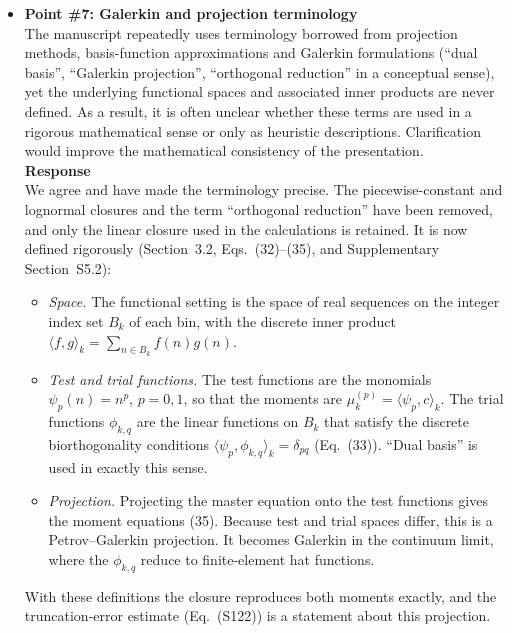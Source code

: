 \documentclass{article}
\newif\ifshowauthornotes
\newcommand{\authornote}[1]{\ifshowauthornotes{\color{red}\ [\textbf{Author action:} #1]}\fi}
\begin{document}
\begin{itemize}
\authornote{Neither item is in the September 17 PDF. (a) Table~S3 lists no solute trap concentrations or binding energies, and the effective-frequency expression (former Eq.~(125)) no longer appears in the main text or S3. Add both, with sources. (b) Add the explicit $G_n$ and $G_{m,\ell}$ used (e.g., normalized power-law or exponential between $n=2$ and $i_{\rm cascade}$) and $\eta$.}

\item \textbf{Point \#7: Galerkin and projection terminology}\\
The manuscript repeatedly uses terminology borrowed from projection methods, basis-function approximations and Galerkin formulations (``dual basis'', ``Galerkin projection'', ``orthogonal reduction'' in a conceptual sense), yet the underlying functional spaces and associated inner products are never defined. As a result, it is often unclear whether these terms are used in a rigorous mathematical sense or only as heuristic descriptions. Clarification would improve the mathematical consistency of the presentation.\\

\textbf{Response}\\
We agree and have made the terminology precise. The piecewise-constant and lognormal closures and the term ``orthogonal reduction'' have been removed, and only the linear closure used in the calculations is retained. It is now defined rigorously (Section~3.2, Eqs.~(32)--(35), and Supplementary Section~S5.2):
\begin{itemize}
    \item \emph{Space.} The functional setting is the space of real sequences on the integer index set $B_k$ of each bin, with the discrete inner product $\langle f,g\rangle_k=\sum_{n\in B_k}f(n)g(n)$.
    \item \emph{Test and trial functions.} The test functions are the monomials $\psi_p(n)=n^p$, $p=0,1$, so that the moments are $\mu_k^{(p)}=\langle\psi_p,c\rangle_k$. The trial functions $\phi_{k,q}$ are the linear functions on $B_k$ that satisfy the discrete biorthogonality conditions $\langle\psi_p,\phi_{k,q}\rangle_k=\delta_{pq}$ (Eq.~(33)). ``Dual basis'' is used in exactly this sense.
    \item \emph{Projection.} Projecting the master equation onto the test functions gives the moment equations (35). Because test and trial spaces differ, this is a Petrov--Galerkin projection. It becomes Galerkin in the continuum limit, where the $\phi_{k,q}$ reduce to finite-element hat functions.
\end{itemize}
With these definitions the closure reproduces both moments exactly, and the truncation-error estimate (Eq.~(S122)) is a statement about this projection.


\end{itemize}
\end{document}

